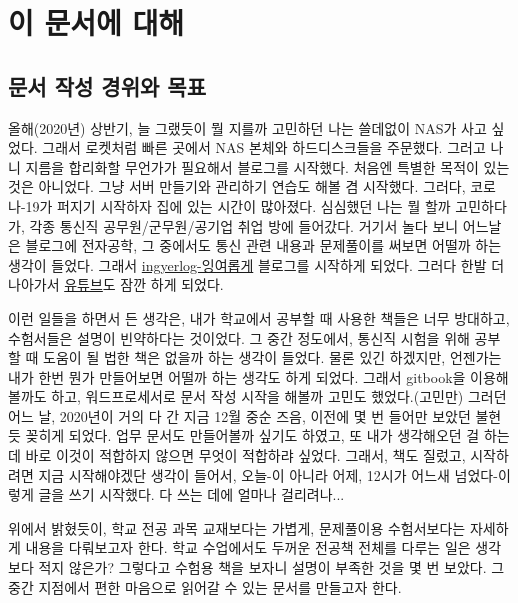 \chapter{이 문서에 대해}

\section{문서 작성 경위와 목표}
올해(2020년) 상반기, 늘 그랬듯이 뭘 지를까 고민하던 나는 쓸데없이 NAS가 사고 싶었다.
그래서 로켓처럼 빠른 곳에서 NAS 본체와 하드디스크들을 주문했다.
그러고 나니 지름을 합리화할 무언가가 필요해서 블로그를 시작했다. 처음엔 특별한 목적이 있는 것은 아니었다.
그냥 서버 만들기와 관리하기 연습도 해볼 겸 시작했다.
그러다, 코로나-19가 퍼지기 시작하자 집에 있는 시간이 많아졌다.
심심했던 나는 뭘 할까 고민하다가, 각종 통신직 공무원/군무원/공기업 취업 방에 들어갔다.
거기서 놀다 보니 어느날은 블로그에 전자공학, 그 중에서도 통신 관련 내용과 문제풀이를 써보면 어떨까 하는 생각이 들었다.
그래서 \href{https://blog.ingyerlog.kr}{ingyerlog-잉여롭게} 블로그를 시작하게 되었다.
그러다 한발 더 나아가서 \href{https://youtube.ingyerlog.kr}{유튜브}도 잠깐 하게 되었다.
\par
이런 일들을 하면서 든 생각은, 내가 학교에서 공부할 때 사용한 책들은 너무 방대하고, 수험서들은 설명이 빈약하다는 것이었다.
그 중간 정도에서, 통신직 시험을 위해 공부할 때 도움이 될 법한 책은 없을까 하는 생각이 들었다.
물론 있긴 하겠지만, 언젠가는 내가 한번 뭔가 만들어보면 어떨까 하는 생각도 하게 되었다.
그래서 gitbook을 이용해볼까도 하고, 워드프로세서로 문서 작성 시작을 해볼까 고민도 했었다.(고민만)
그러던 어느 날, 2020년이 거의 다 간 지금 12월 중순 즈음, 이전에 몇 번 들어만 보았던  불현듯 꽂히게 되었다.
업무 문서도  만들어볼까 싶기도 하였고, 또 내가 생각해오던 걸 하는 데 바로 이것이 적합하지 않으면 무엇이 적합하랴 싶었다.
그래서, 책도 질렀고, 시작하려면 지금 시작해야겠단 생각이 들어서, 오늘-이 아니라 어제, 12시가 어느새 넘었다-이렇게 글을 쓰기 시작했다.
다 쓰는 데에 얼마나 걸리려나...
\par
위에서 밝혔듯이, 학교 전공 과목 교재보다는 가볍게, 문제풀이용 수험서보다는 자세하게 내용을 다뤄보고자 한다.
학교 수업에서도 두꺼운 전공책 전체를 다루는 일은 생각보다 적지 않은가?
그렇다고 수험용 책을 보자니 설명이 부족한 것을 몇 번 보았다.
그 중간 지점에서 편한 마음으로 읽어갈 수 있는 문서를 만들고자 한다.

